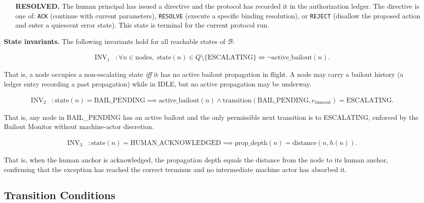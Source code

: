\begin{itemize}
\item[\textbf{RESOLVED.}] The human principal has issued a directive and the protocol has recorded it in the authorization ledger. The directive is one of: \texttt{ACK} (continue with current parameters), \texttt{RESOLVE} (execute a specific binding resolution), or \texttt{REJECT} (disallow the proposed action and enter a quiescent error state). This state is terminal for the current protocol run.
\end{itemize}

\bigskip
\noindent\textbf{State invariants.} The following invariants hold for all reachable states of $\mathcal{B}$:

\begin{align}
\text{INV}_1 &: \forall n \in \text{nodes},\; \text{state}(n) \in Q \setminus \{\text{ESCALATING}\} \iff \neg\text{active\_bailout}(n). \tag{INV-1}
\end{align}

That is, a node occupies a non-escalating state \emph{iff} it has no active bailout propagation in flight. A node may carry a bailout history (a ledger entry recording a past propagation) while in IDLE, but no active propagation may be underway.

\begin{align}
\text{INV}_2 &: \text{state}(n) = \text{BAIL\_PENDING} \implies \text{active\_bailout}(n) \land \text{transition}(\text{BAIL\_PENDING}, e_{\text{timeout}}) = \text{ESCALATING}. \tag{INV-2}
\end{align}

That is, any node in BAIL\_PENDING has an active bailout and the only permissible next transition is to ESCALATING, enforced by the Bailout Monitor without machine-actor discretion.

\begin{align}
\text{INV}_3 &: \text{state}(n) = \text{HUMAN\_ACKNOWLEDGED} \implies \text{prop\_depth}(n) = \text{distance}(n, h(n)). \tag{INV-3}
\end{align}

That is, when the human anchor is acknowledged, the propagation depth equals the distance from the node to its human anchor, confirming that the exception has reached the correct terminus and no intermediate machine actor has absorbed it.

\subsection{Transition Conditions}\label{sec:transition-conditions}

